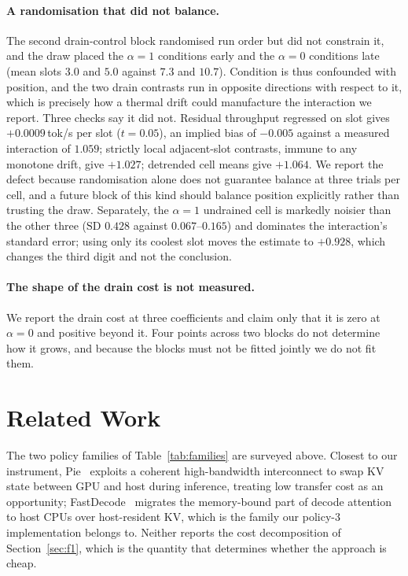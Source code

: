\documentclass[manuscript,anonymous,review]{acmart}
\begin{document}
\paragraph{A randomisation that did not balance.} The second
drain-control block randomised run order but did not constrain it, and
the draw placed the $\alpha = 1$ conditions early and the $\alpha = 0$
conditions late (mean slots $3.0$ and $5.0$ against $7.3$ and $10.7$).
Condition is thus confounded with position, and the two drain contrasts
run in opposite directions with respect to it, which is precisely how a
thermal drift could manufacture the interaction we report. Three checks
say it did not. Residual throughput regressed on slot gives
$+0.0009$\,tok/s per slot ($t = 0.05$), an implied bias of $-0.005$
against a measured interaction of $1.059$; strictly local
adjacent-slot contrasts, immune to any monotone drift, give $+1.027$;
detrended cell means give $+1.064$. We report the defect because
randomisation alone does not guarantee balance at three trials per
cell, and a future block of this kind should balance position
explicitly rather than trusting the draw. Separately, the
$\alpha = 1$ undrained cell is markedly noisier than the other three
($\text{SD}$ $0.428$ against $0.067$--$0.165$) and dominates the
interaction's standard error; using only its coolest slot moves the
estimate to $+0.928$, which changes the third digit and not the
conclusion.

\paragraph{The shape of the drain cost is not measured.} We report the
drain cost at three coefficients and claim only that it is zero at
$\alpha = 0$ and positive beyond it. Four points across two blocks do
not determine how it grows, and because the blocks must not be fitted
jointly we do not fit them.

\section{Related Work}
\label{sec:related}

The two policy families of Table~\ref{tab:families} are surveyed above.
Closest to our instrument, Pie~\cite{pie2024} exploits a coherent
high-bandwidth interconnect to swap KV state between GPU and host
during inference, treating low transfer cost as an opportunity;
FastDecode~\cite{he2024fastdecode} migrates the memory-bound part of
decode attention to host CPUs over host-resident KV, which is the
family our policy-3 implementation belongs to. Neither reports the
cost decomposition of Section~\ref{sec:f1}, which is the quantity that
determines whether the approach is cheap.
\end{document}
